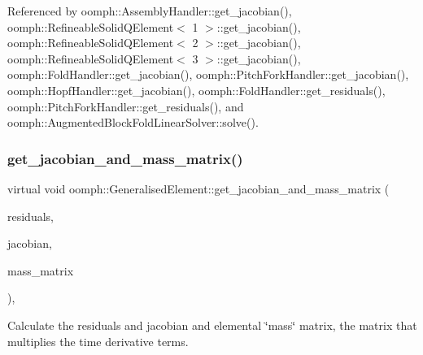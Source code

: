 Referenced by oomph\+::\+Assembly\+Handler\+::get\+\_\+jacobian(), oomph\+::\+Refineable\+Solid\+Q\+Element$<$ 1 $>$\+::get\+\_\+jacobian(), oomph\+::\+Refineable\+Solid\+Q\+Element$<$ 2 $>$\+::get\+\_\+jacobian(), oomph\+::\+Refineable\+Solid\+Q\+Element$<$ 3 $>$\+::get\+\_\+jacobian(), oomph\+::\+Fold\+Handler\+::get\+\_\+jacobian(), oomph\+::\+Pitch\+Fork\+Handler\+::get\+\_\+jacobian(), oomph\+::\+Hopf\+Handler\+::get\+\_\+jacobian(), oomph\+::\+Fold\+Handler\+::get\+\_\+residuals(), oomph\+::\+Pitch\+Fork\+Handler\+::get\+\_\+residuals(), and oomph\+::\+Augmented\+Block\+Fold\+Linear\+Solver\+::solve().

\mbox{\label{classoomph_1_1GeneralisedElement_acd153d7425b92936314100a7b7354bdc}} 
\subsubsection{\texorpdfstring{get\+\_\+jacobian\+\_\+and\+\_\+mass\+\_\+matrix()}{get\_jacobian\_and\_mass\_matrix()}}
{\footnotesize\ttfamily virtual void oomph\+::\+Generalised\+Element\+::get\+\_\+jacobian\+\_\+and\+\_\+mass\+\_\+matrix (\begin{DoxyParamCaption}\item[{\hyperlink{classoomph_1_1Vector}{Vector}$<$ double $>$ \&}]{residuals,  }\item[{\hyperlink{classoomph_1_1DenseMatrix}{Dense\+Matrix}$<$ double $>$ \&}]{jacobian,  }\item[{\hyperlink{classoomph_1_1DenseMatrix}{Dense\+Matrix}$<$ double $>$ \&}]{mass\+\_\+matrix }\end{DoxyParamCaption})\hspace{0.3cm}{\ttfamily [inline]}, {\ttfamily [virtual]}}



Calculate the residuals and jacobian and elemental \char`\"{}mass\char`\"{} matrix, the matrix that multiplies the time derivative terms. 



